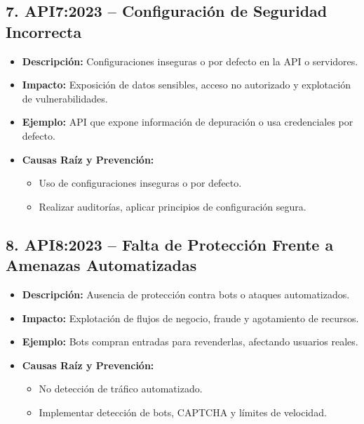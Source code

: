 \documentclass[a4paper,12pt]{article}
\begin{document}
\subsection{7. API7:2023 – Configuración de Seguridad Incorrecta}
\begin{itemize}
    \item \textbf{Descripción:} Configuraciones inseguras o por defecto en la API o servidores.
    \item \textbf{Impacto:} Exposición de datos sensibles, acceso no autorizado y explotación de vulnerabilidades.
    \item \textbf{Ejemplo:} API que expone información de depuración o usa credenciales por defecto.
    \item \textbf{Causas Raíz y Prevención:}
    \begin{itemize}
        \item Uso de configuraciones inseguras o por defecto.
        \item Realizar auditorías, aplicar principios de configuración segura.
    \end{itemize}
\end{itemize}

\subsection{8. API8:2023 – Falta de Protección Frente a Amenazas Automatizadas}
\begin{itemize}
    \item \textbf{Descripción:} Ausencia de protección contra bots o ataques automatizados.
    \item \textbf{Impacto:} Explotación de flujos de negocio, fraude y agotamiento de recursos.
    \item \textbf{Ejemplo:} Bots compran entradas para revenderlas, afectando usuarios reales.
    \item \textbf{Causas Raíz y Prevención:}
    \begin{itemize}
        \item No detección de tráfico automatizado.
        \item Implementar detección de bots, CAPTCHA y límites de velocidad.
    \end{itemize}
\end{itemize}
\end{document}
